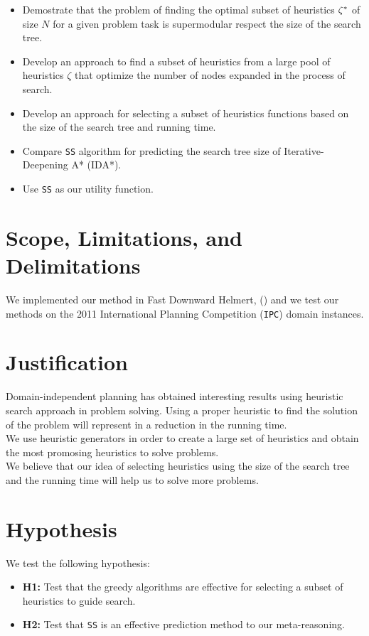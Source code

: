 \begin{itemize}
  \item Demostrate that the problem of finding the optimal subset of heuristics $\zeta\sp{*}$ of size $N$ for a given problem task is supermodular respect the size of the search tree.
  
  \item Develop an approach to find a subset of heuristics from a large pool of heuristics $\zeta$ that optimize the number of nodes expanded in the process of search.
  
  \item Develop an approach for selecting a subset of heuristics functions based on the size of the search tree and running time.

  \item Compare \texttt{SS} algorithm for predicting the search tree size of Iterative-Deepening A* (IDA*).
  
  \item Use \texttt{SS} as our utility function.

\end{itemize}
\section{Scope, Limitations, and Delimitations}
\noindent
We implemented our method in Fast Downward Helmert,  (\citeyear{helmert2006fast}) and we test our methods on the 2011 International Planning Competition (\texttt{IPC}) domain instances.\\

\section{Justification}
\noindent
Domain-independent planning has obtained interesting results using heuristic search approach in problem solving. Using a proper heuristic to find the solution of the problem will represent in a reduction in the running time.\\

We use heuristic generators in order to create a large set of heuristics and obtain the most promosing heuristics to solve problems.\\

We believe that our idea of selecting heuristics using the size of the search tree and the running time will help us to solve more problems.

\section{Hypothesis}
\noindent
We test the following hypothesis:
\begin{itemize}
\item \textbf{H1:} Test that the greedy algorithms are effective for selecting a subset of heuristics to guide search.

\item \textbf{H2:} Test that \texttt{SS} is an effective prediction method to our meta-reasoning.
\end{itemize}

